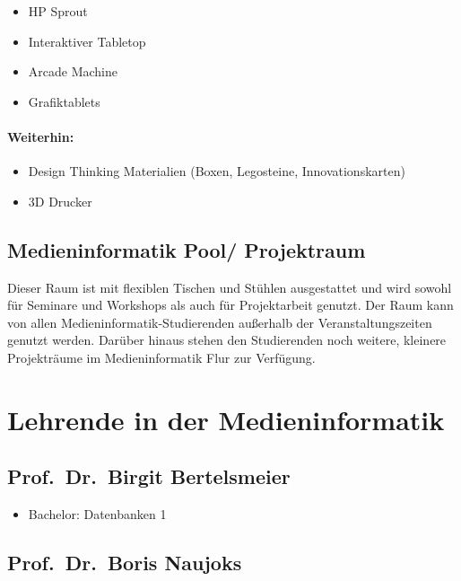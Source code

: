 \begin{itemize}
\tightlist
\item
  HP Sprout
\item
  Interaktiver Tabletop
\item
  Arcade Machine
\item
  Grafiktablets
\end{itemize}

\paragraph{Weiterhin:}\label{weiterhin}

\begin{itemize}
\tightlist
\item
  Design Thinking Materialien (Boxen, Legosteine, Innovationskarten)
\item
  3D Drucker
\end{itemize}

\subsection{Medieninformatik Pool/
Projektraum}\label{medieninformatik-pool-projektraum}

Dieser Raum ist mit flexiblen Tischen und Stühlen ausgestattet und wird
sowohl für Seminare und Workshops als auch für Projektarbeit genutzt.
Der Raum kann von allen Medieninformatik-Studierenden außerhalb der
Veranstaltungszeiten genutzt werden. Darüber hinaus stehen den
Studierenden noch weitere, kleinere Projekträume im Medieninformatik
Flur zur Verfügung.

\section{Lehrende in der
Medieninformatik}\label{lehrende-in-der-medieninformatik}

\subsection{Prof.~Dr.~Birgit
Bertelsmeier}\label{prof.dr.birgit-bertelsmeier}

\begin{itemize}
\tightlist
\item
  Bachelor: Datenbanken 1
\end{itemize}

\subsection{Prof.~Dr.~Boris Naujoks}\label{prof.dr.boris-naujoks}

